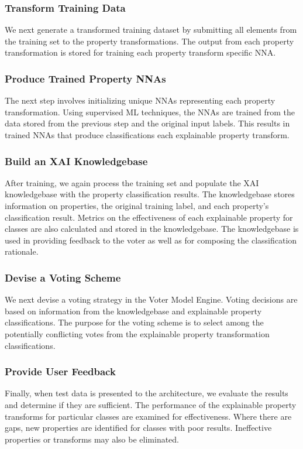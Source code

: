 \documentclass[conference]{IEEEtran}
\begin{document}
\subsubsection{Transform Training Data} 
We next generate a transformed training dataset by submitting all elements from the training set to the property transformations.  The output from each property transformation is stored for training each property transform specific NNA. 

\subsubsection{Produce Trained Property NNAs}
The next step involves initializing unique NNAs representing each property transformation.  Using supervised ML techniques, the NNAs are trained from the data stored from the previous step and the original input labels.  This results in trained NNAs that produce classifications each explainable property transform.

\subsubsection{Build an XAI Knowledgebase}
After training, we again process the training set and populate the XAI knowledgebase with the property classification results.  The knowledgebase stores information on properties, the original training label, and each property's classification result.  Metrics on the effectiveness of each explainable property for classes are also calculated and stored in the knowledgebase.  The knowledgebase is used in providing feedback to the voter as well as for composing the classification rationale.

\subsubsection{Devise a Voting Scheme}
We next devise a voting strategy in the Voter Model Engine.  Voting decisions are based on information from the knowledgebase and explainable property classifications.  The purpose for the voting scheme is to select among the potentially conflicting votes from the explainable property transformation classifications.

\subsubsection{Provide User Feedback}
Finally, when test data is presented to the architecture, we evaluate the results and determine if they are sufficient.  The performance of the explainable property transforms for particular classes are examined for effectiveness.  Where there are gaps, new properties are identified for classes with poor results.  Ineffective properties or transforms may also be eliminated.
\end{document}
